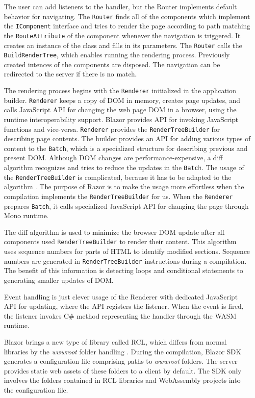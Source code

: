 The user can add listeners to the handler, but the Router implements default behavior for navigating.
The \texttt{Router} finds all of the components which implement the \texttt{IComponent} interface and tries to render the page according to path matching the \texttt{RouteAttribute} of the component whenever the navigation is triggered.
It creates an instance of the class and fills in its parameters.
The \texttt{Router} calls the \texttt{BuildRenderTree}, which enables running the rendering process.
Previously created intences of the components are disposed.
The navigation can be redirected to the server if there is no match.
\par
The rendering process begins with the \texttt{Renderer} initialized in the application builder.
\texttt{Renderer} keeps a copy of DOM in memory, creates page updates, and calls JavaScript API for changing the web page DOM in a browser, using the runtime interoperability support.
Blazor provides API for invoking JavaScript functions and vice-versa.
\texttt{Renderer} provides the \texttt{RenderTreeBuilder} for describing page contents.
The builder provides an API for adding various types of content to the \texttt{Batch}, which is a specialized structure for describing previous and present DOM.
Although DOM changes are performance-expensive, a diff algorithm \cite{online:diffAlgorithm} recognizes and tries to reduce the updates in the \texttt{Batch}.
The usage of the \texttt{RenderTreeBuilder} is complicated, because it has to be adapted to the algorithm \cite{online:renderTree}.
The purpose of Razor is to make the usage more effortless when the compilation implements the \texttt{RenderTreeBuilder} for us.
When the \texttt{Renderer} prepares \texttt{Batch}, it calls specialized JavaScript API for changing the page through Mono runtime.
\par
The diff algorithm is used to minimize the browser DOM  update after all components used \texttt{RenderTreeBuilder} to render their content.
This algorithm uses sequence numbers for parts of HTML to identify modified sections.
Sequence numbers are generated in \texttt{RenderTreeBuilder} instructions during a compilation.
The benefit of this information is detecting loops and conditional statements to generating smaller updates of DOM.  
\par
Event handling is just clever usage of the Renderer with dedicated JavaScript API for updating, where the API registers the listener.
When the event is fired, the listener invokes C\# method representing the handler through the WASM runtime.
\par
Blazor brings a new type of library called \ac{RCL}, which differs from normal libraries by the \textit{wwwroot} folder handling \cite{online:rcl}.
During the compilation, Blazor \ac{SDK} generates a configuration file comprising paths to \textit{wwwroot} folders.
The server provides static web assets of these folders to a client by default.
The SDK only involves the folders contained in RCL libraries and WebAssembly projects into the configuration file.

